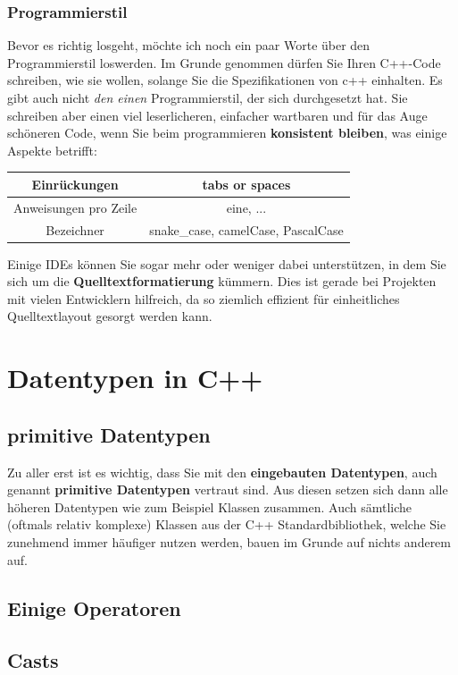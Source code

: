 \documentclass[a4paper]{report}
\begin{document}
\subsection{Programmierstil}
Bevor es richtig losgeht, möchte ich noch ein paar Worte über den Programmierstil loswerden. Im Grunde genommen dürfen Sie Ihren C++-Code schreiben, wie sie wollen, solange Sie die Spezifikationen von c++ einhalten. Es gibt auch nicht \textit{den einen} Programmierstil, der sich durchgesetzt hat. Sie schreiben aber einen viel leserlicheren, einfacher wartbaren und für das Auge schöneren Code, wenn Sie beim programmieren \textbf{konsistent bleiben}, was einige Aspekte betrifft:
\begin{center}
	\begin{tabular}{|c||c|}
		\hline
		Einrückungen	&	tabs or spaces \\ \hline
		Anweisungen pro Zeile & eine, ... \\ \hline
		Bezeichner		&	snake\_case, camelCase, PascalCase \\ \hline
	\end{tabular}
\end{center}
Einige IDEs können Sie sogar mehr oder weniger dabei unterstützen, in dem Sie sich um die \textbf{Quelltextformatierung} kümmern. Dies ist gerade bei Projekten mit vielen Entwicklern hilfreich, da so ziemlich effizient für einheitliches Quelltextlayout gesorgt werden kann.

\chapter{Datentypen in C++} \label{real_start}

\section{primitive Datentypen}
Zu aller erst ist es wichtig, dass Sie mit den \textbf{eingebauten Datentypen}, auch genannt \textbf{primitive Datentypen} vertraut sind. Aus diesen setzen sich dann alle höheren Datentypen wie zum Beispiel Klassen zusammen. Auch sämtliche (oftmals relativ komplexe) Klassen aus der C++ Standardbibliothek, welche Sie zunehmend immer häufiger nutzen werden, bauen im Grunde auf nichts anderem auf.

\section{Einige Operatoren}
\section{Casts}
\end{document}
